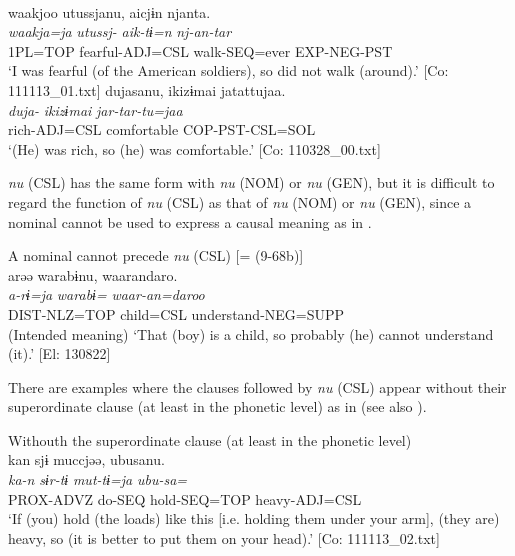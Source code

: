 \ea\label{ex:10.37} 
  \ea\relax [= (9-44 c)]\\
      \glll    waakjoo  utussjanu,  aicjɨn  njanta.\\
      \textit{waakja=ja}  \textit{utussj-}  \textit{aik-tɨ=n}  \textit{nj-an-tar}\\
      1PL=TOP  fearful-ADJ=CSL  walk-SEQ=ever  EXP-NEG-PST\\
      \glt       ‘I was fearful (of the American soldiers), so did not walk (around).’ [Co: 111113\_01.txt]
  \ex   %
      \glll    dujasanu,  ikizɨmai  jatattujaa.\\
      \textit{duja-}  \textit{ikizɨmai}  \textit{jar-tar-tu=jaa}\\
      rich-ADJ=CSL  comfortable  COP-PST-CSL=SOL\\
      \glt       ‘(He) was rich, so (he) was comfortable.’ [Co: 110328\_00.txt]
    \z
\z

  \textit{nu} (CSL) has the same form with \textit{nu} (NOM) or \textit{nu} (GEN), but it is difficult to regard the function of \textit{nu} (CSL) as that of \textit{nu} (NOM) or \textit{nu} (GEN), since a nominal cannot be used to express a causal meaning as in .

\ea\label{ex:10.38}   A nominal cannot precede \textit{nu} (CSL) [= (9-68b)]\\
      \glll    *arəə  warabɨnu,  waarandaro.\\
     \textit{a-rɨ=ja}  \textit{warabɨ=}  \textit{waar-an=daroo}\\
     DIST-NLZ=TOP  child=CSL  understand-NEG=SUPP\\
    \glt     (Intended meaning) ‘That (boy) is a child, so probably (he) cannot understand (it).’ [El: 130822]
\z

  There are examples where the clauses followed by \textit{nu} (CSL) appear without their superordinate clause (at least in the phonetic level) as in  (see also ).

\ea\label{ex:10.39}   Withouth the superordinate clause (at least in the phonetic level)\\%
      \glll    kan  sjɨ  muccjəə,  ubusanu.\\
    \textit{ka-n}  \textit{sɨr-tɨ}  \textit{mut-tɨ=ja}  \textit{ubu-sa=}\\
    PROX-ADVZ  do-SEQ  hold-SEQ=TOP  heavy-ADJ=CSL\\
\glt     ‘If (you) hold (the loads) like this [i.e. holding them under your arm], (they are) heavy, so (it is better to put them on your head).’  [Co: 111113\_02.txt]
\z

